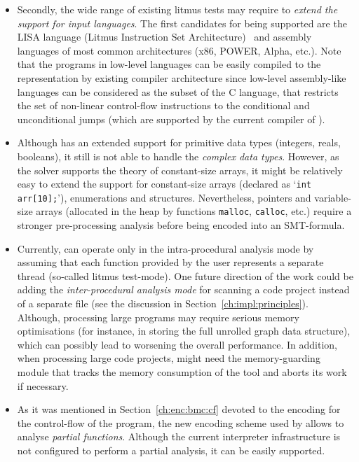 \begin{itemize}[leftmargin=\parindent]
\item Secondly, the wide range of existing litmus tests may require \porthos[2] to \textit{extend the support for input languages}.
The first candidates for being supported are the LISA language (Litmus Instruction Set Architecture)~\cite{alglave2016syntax} and assembly languages of most common architectures (x86, POWER, Alpha, etc.).
Note that the programs in low-level languages can be easily compiled to the \xgraph{} representation by existing compiler architecture since low-level assembly-like languages can be considered as the subset of the C language, that restricts the set of non-linear control-flow instructions to the conditional and unconditional jumps (which are supported by the current \xgraph{} compiler of \porthos[2]).

\item Although \porthos[2] has an extended support for primitive data types (integers, reals, booleans), it still is not able to handle the \textit{complex data types}.
However, as the  solver supports the theory of constant-size arrays, it might be relatively easy to extend the support for constant-size arrays (declared as `\lstinline{int arr[10];}'), enumerations and structures.
Nevertheless, pointers and variable-size arrays (allocated in the heap by functions \lstinline{malloc}, \lstinline{calloc}, etc.) require a stronger pre-processing analysis before being encoded into an SMT-formula.

\item Currently, \porthos[2] can operate only in the intra-procedural analysis mode by assuming that each function provided by the user represents a separate thread (so-called litmus test-mode).
One future direction of the work could be adding the \textit{inter-procedural analysis mode} for scanning a code project instead of a separate file (see the discussion in Section~\ref{ch:impl:principles}).
Although, processing large programs may require serious memory optimisations (for instance, in storing the full unrolled graph data structure), which can possibly lead to worsening the overall performance.
In addition, when processing large code projects, \porthos[2] might need the memory-guarding module that tracks the memory consumption of the tool and aborts its work if necessary.

\item As it was mentioned in Section~\ref{ch:enc:bmc:cf} devoted to the encoding for the control-flow of the program, the new encoding scheme used by \porthos[2] allows to analyse \textit{partial functions}.
Although the current \porthos[2] interpreter infrastructure is not configured to perform a partial analysis, it can be easily supported.


\end{itemize}
